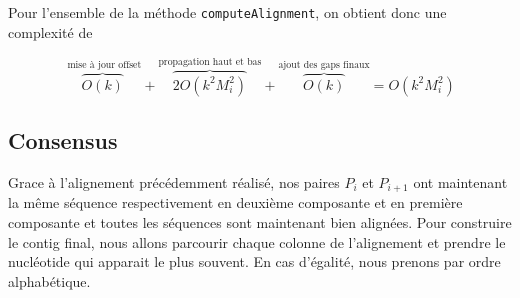 Pour l'ensemble de la méthode \verb|computeAlignment|, on obtient donc une
complexité de

\begin{equation}
	\overbrace{O(k)}^{\text{ mise à jour offset}} + \overbrace{2 O(k^{2}
	M_{i}^{2})}^{\text{propagation haut et bas}} + \overbrace{O(k)}^{\text{ajout
	des gaps finaux}} = O(k^{2} M_{i}^{2})
\end{equation}


\subsection{Consensus}
\label{subsection:consensus}

Grace à l'alignement précédemment réalisé, nos paires $P_{i}$ et $P_{i + 1}$ ont
maintenant la même séquence respectivement en deuxième composante et en première
composante et toutes les séquences sont maintenant bien alignées. Pour
construire le contig final, nous allons parcourir chaque colonne de l'alignement
et prendre le nucléotide qui apparait le plus souvent. En cas d'égalité, nous
prenons par ordre alphabétique.

